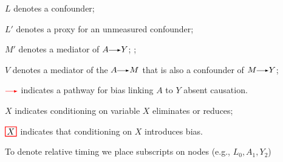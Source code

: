 {\begin{tabular}
{$L$ denotes a confounder;

$L'$ denotes a proxy for an unmeasured confounder;

$M'$ denotes a mediator of $A\rightarrowNEW Y$; ;

$V$ denotes a mediator of the $A\rightarrowNEW M$ that is also a confounder of $M\rightarrowNEW Y$;

$\rightarrowred$ indicates a pathway for bias linking $A$ to $Y$ absent causation.

$\boxed{X}$ indicates conditioning on variable $X$ eliminates or reduces;

$\boxedred{X}$ indicates that conditioning on $X$ introduces bias.

To denote relative timing we place subscripts on nodes (e.g., $L_0, A_1, Y_2$)}
\end{tabular}
}
\newcommand{\terminologyelconfoundersexperiments}{
\newcounter{exprownum} %
\setcounter{exprownum}{0} %
\renewcommand{\arraystretch}{1} %
\centering
\begin{tabular}{>{\raggedright\arraybackslash\small}m{0.5cm} >{\raggedright\arraybackslash\small}m{4.65cm} >{\raggedright\arraybackslash\small}m{6.35cm} >{\raggedright\arraybackslash\small}m{2.5cm}}
\multicolumn{4}{c}{\textbf{Confounding in experiments}}\\
\toprule
& \textbf{Bias} & \textbf{Problem} & \textbf{Response} \\ \midrule
\stepcounter{exprownum}\arabic{exprownum} & Post-exposure `control' & $\mediatorAX$  &  $\commoncauseALATENTshort$ \\
\stepcounter{exprownum}\arabic{exprownum} & Post-exposure collider stratification bias & $\mediatorcolliderX$ & $\commoncauseALATENTshort$ \\
\stepcounter{exprownum}\arabic{exprownum} & Demographics measured post-outcome & $\experimentAYcollider$ & $\commoncausesolvedAshort$ \\
\stepcounter{exprownum}\arabic{exprownum} & Demographics measured post-outcome & $\experimentAYcolliderU$ & $\commoncausesolvedAshort$ \\
\stepcounter{exprownum}\arabic{exprownum} & Treatment affects censoring & $\sdCshortVERYX$ & Inverse probability of censoring weights \\
\stepcounter{exprownum}\arabic{exprownum} & Per protocol: unmeasured variable affects adherence & \perprotocolONE & Condition on $\boxed{L_0}$ and $\boxed{L_1}$ \\
\stepcounter{exprownum}\arabic{exprownum} & Per protocol: unmeasured variable and treatment both affect adherence & \perprotocolTWO  &  Use special estimators\\
\stepcounter{exprownum}\arabic{exprownum} & Per protocol: unmeasured variable and treatment both affect adherence & \perprotocolTWOS  &  Use special estimators: stronger assumptions\\
\bottomrule
\end{tabular}
}
